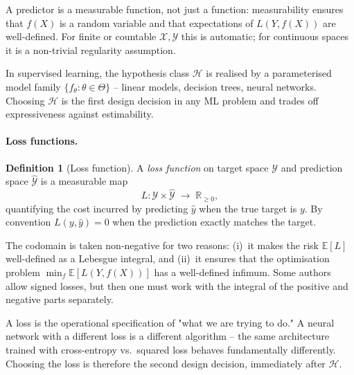 \documentclass[11pt]{article}
\theoremstyle{definition}
\newtheorem{definition}{Definition}
\begin{document}
\begin{mathnote}
A predictor is a measurable function, not just a function: measurability
ensures that $f(X)$ is a random variable and that expectations of $L(Y, f(X))$
are well-defined. For finite or countable $\mathcal{X}, \mathcal{Y}$ this is
automatic; for continuous spaces it is a non-trivial regularity assumption.
\end{mathnote}

\begin{mlnote}
In supervised learning, the hypothesis class $\mathcal{H}$ is realised by a
parameterised model family $\{f_\theta : \theta \in \Theta\}$ -- linear
models, decision trees, neural networks. Choosing $\mathcal{H}$ is the
first design decision in any ML problem and trades off expressiveness
against estimability.
\end{mlnote}

\paragraph{Loss functions.}

\begin{definition}[Loss function]
A \emph{loss function} on target space $\mathcal{Y}$ and prediction space
$\widehat{\mathcal{Y}}$ is a measurable map
\[
  L : \mathcal{Y} \times \widehat{\mathcal{Y}} \;\to\; \mathbb{R}_{\geq 0},
\]
quantifying the cost incurred by predicting $\hat y$ when the true target
is $y$. By convention $L(y, \hat y) = 0$ when the prediction exactly matches
the target.
\end{definition}

\begin{mathnote}
The codomain is taken non-negative for two reasons: (i)~it makes the risk
$\mathbb{E}[L]$ well-defined as a Lebesgue integral, and (ii)~it ensures
that the optimisation problem $\min_f \mathbb{E}[L(Y, f(X))]$ has a
well-defined infimum. Some authors allow signed losses, but then one must
work with the integral of the positive and negative parts separately.
\end{mathnote}

\begin{mlnote}
A loss is the operational specification of "what we are trying to do." A
neural network with a different loss is a different algorithm -- the same
architecture trained with cross-entropy vs.\ squared loss behaves
fundamentally differently. Choosing the loss is therefore the second design
decision, immediately after $\mathcal{H}$.
\end{mlnote}
\end{document}
